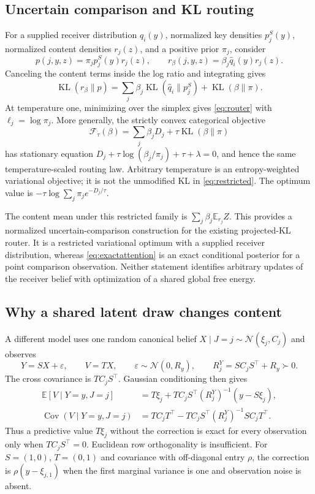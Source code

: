 \documentclass[11pt,letterpaper]{article}
\newcommand{\E}{\mathbb E}
\newcommand{\KL}{\operatorname{KL}}
\newcommand{\Cov}{\operatorname{Cov}}
\begin{document}
\subsection{Uncertain comparison and KL routing}
For a supplied receiver distribution $\widehat q_i(y)$, normalized key densities $p_j^S(y)$, normalized content densities $r_j(z)$, and a positive prior $\pi_j$, consider
\begin{equation}
 p(j,y,z)=\pi_jp_j^S(y)r_j(z),\qquad
 r_\beta(j,y,z)=\beta_j\widehat q_i(y)r_j(z).
\end{equation}
Canceling the content terms inside the log ratio and integrating gives
\begin{equation}
 \KL(r_\beta\|p)=\sum_j\beta_j\KL(\widehat q_i\|p_j^S)+\KL(\beta\|\pi).
 \label{eq:restricted}
\end{equation}
At temperature one, minimizing over the simplex gives \eqref{eq:router} with $\ell_j=\log\pi_j$. More generally, the strictly convex categorical objective
\begin{equation}
 \mathcal F_\tau(\beta)=\sum_j\beta_jD_j+\tau\KL(\beta\|\pi)
\end{equation}
has stationary equation $D_j+\tau\log(\beta_j/\pi_j)+\tau+\lambda=0$, and hence the same temperature-scaled routing law. Arbitrary temperature is an entropy-weighted variational objective; it is not the unmodified KL in \eqref{eq:restricted}. The optimum value is $-\tau\log\sum_j\pi_j e^{-D_j/\tau}$.

The content mean under this restricted family is $\sum_j\beta_j\E_{r_j}Z$. This provides a normalized uncertain-comparison construction for the existing projected-KL router. It is a restricted variational optimum with a supplied receiver distribution, whereas \eqref{eq:exactattention} is an exact conditional posterior for a point comparison observation. Neither statement identifies arbitrary updates of the receiver belief with optimization of a shared global free energy.

\subsection{Why a shared latent draw changes content}
A different model uses one random canonical belief $X\mid J=j\sim\mathcal N(\xi_j,C_j)$ and observes
\begin{equation}
 Y=SX+\varepsilon,\qquad V=TX,\qquad
 \varepsilon\sim\mathcal N(0,R_y),\qquad R_j^Y=SC_jS^\top+R_y\succ0.
\end{equation}
The cross covariance is $TC_jS^\top$. Gaussian conditioning then gives
\begin{align}
 \E[V\mid Y=y,J=j]
 &=T\xi_j+TC_jS^\top(R_j^Y)^{-1}(y-S\xi_j),\\
 \Cov(V\mid Y=y,J=j)
 &=TC_jT^\top-TC_jS^\top(R_j^Y)^{-1}SC_jT^\top.
 \label{eq:correction}
\end{align}
Thus a predictive value $T\xi_j$ without the correction is exact for every observation only when $TC_jS^\top=0$. Euclidean row orthogonality is insufficient. For $S=(1,0)$, $T=(0,1)$ and covariance with off-diagonal entry $\rho$, the correction is $\rho(y-\xi_{j,1})$ when the first marginal variance is one and observation noise is absent.
\end{document}
